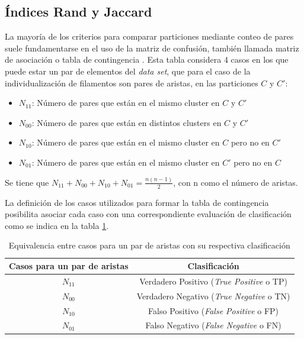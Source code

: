 \subsection{\'Indices Rand y Jaccard}

La mayor\'ia de los criterios para comparar particiones mediante conteo de pares suele fundamentarse en el uso de la matriz de confusi\'on, tambi\'en llamada matriz de asociaci\'on o tabla de contingencia . Esta tabla considera 4 casos en los que puede estar un par de elementos del {\it data set}, que para el caso de la individualizaci\'on de filamentos son pares de aristas, en las particiones $C$ y $C'$:

\begin{itemize}
    \item $N_{11}$: N\'umero de pares que est\'an en el mismo cluster en $C$ y $C'$
    \item $N_{00}$: N\'umero de pares que est\'an en distintos clusters en $C$ y $C'$
    \item $N_{10}$: N\'umero de pares que est\'an en el mismo cluster en $C$ pero no en $C'$
    \item $N_{01}$: N\'umero de pares que est\'an en el mismo cluster en $C'$ pero no en $C$
\end{itemize}

Se tiene que $N_{11} + N_{00} + N_{10} + N_{01} = \frac{n(n-1)}{2}$, con n como el n\'umero de aristas.

La definici\'on de los casos utilizados para formar la tabla de contingencia posibilita asociar cada caso con una correspondiente evaluaci\'on de clasificaci\'on como se indica en la tabla \ref{tab:EquivParesClasificacion}.

\begin{table}[h]
    \centering
    \begin{tabular}{|c|c|}
    \hline
        Casos para un par de aristas & Clasificaci\'on \\ \hline
        $N_{11}$ & Verdadero Positivo ({\it True Positive} o TP) \\
        $N_{00}$ & Verdadero Negativo ({\it True Negative} o TN)\\
        $N_{10}$ & Falso Positivo ({\it False Positive} o FP)\\
        $N_{01}$ & Falso Negativo ({\it False Negative} o FN)\\ \hline
    \end{tabular}
    \caption{Equivalencia entre casos para un par de aristas con su respectiva clasificaci\'on}
    \label{tab:EquivParesClasificacion}
\end{table}

